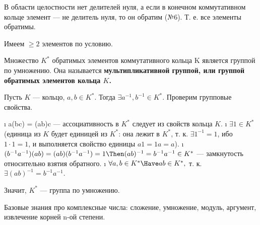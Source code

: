 \begin{solution}
В области целостности нет делителей нуля, а если в конечном коммутативном кольце элемент --- не делитель нуля, то он обратим (№6). Т. е. все элементы обратимы.

Имеем \(\ge 2\) элементов по условию.
\end{solution}

\begin{problem}[8]
Множество $K^*$ обратимых элементов коммутативного кольца K является группой по умножению. Она называется \bf{мультипликативной группой}, или \bf{группой обратимых элементов} кольца $K$.
\end{problem}

\begin{solution}
Пусть \(K\) --- кольцо, \(a, b \in K^*\). Тогда \(\exists a^{-1}, b^{-1} \in K^*\). Проверим групповые свойства.

\begin{enumerate}[label=\arabic{enumi}.]
\tightlist
\i
  a(bc) = (ab)c --- ассоциативность в \(K^*\) следует из свойств кольца \(K\).
\i
  \(\exists 1 \in K^*\) (единица из $K$ будет единицей из $K^*$: она лежит в $K^*$, т. к. $\exists 1^{-1} = 1$, ибо $1\cdot 1 = 1$, и выполняется свойство единицы $a1=1a=a$).
\i
  \((b^{-1}a^{-1})(ab) = (ab)(b^{-1}a^{-1})=1 \Then (ab)^{-1} = b^{-1} a^{-1} \in K^*\) --- замкнутость относительно взятия обратного.
\i
  \(\forall a, b \in K^* \Have ab \in K^*,\) т. к. $\exists (ab)^{-1} = b^{-1}a^{-1}$.
\end{enumerate}

Значит, \(K^*\) --- группа по умножению.
\end{solution}

\begin{problem}[9(1.5-1.7)]
Базовые знания про комплексные числа: сложение, умножение, модуль, аргумент, извлечение корней n-ой степени.
\end{problem}

